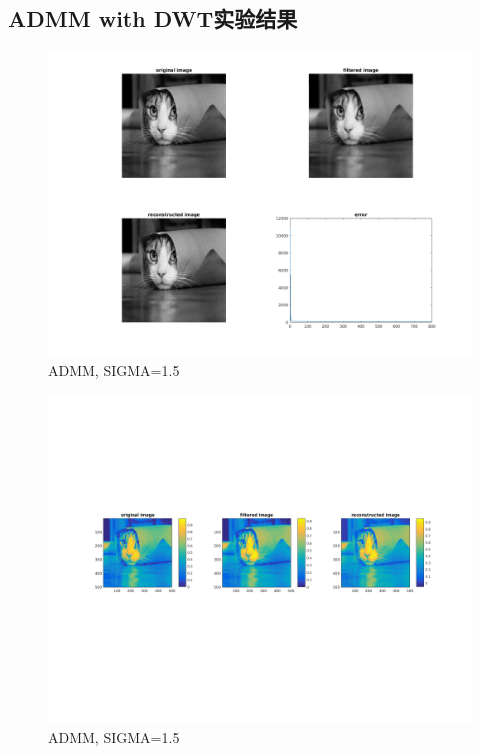 \documentclass[a4paper, UTF8]{ctexrep}
\begin{document}
		\subsection{ADMM with DWT实验结果} %
		\label{sub:admm_with_dwt实验结果}
			\begin{figure}[h]
				\centering
				\includegraphics[width=\textwidth]{hw4_fig1.png}
				\caption{ADMM, SIGMA=1.5}
				\label{fig:figure1}
			\end{figure}
			\clearpage
			\begin{figure}[h]
				\centering
				\includegraphics[width=\textwidth]{hw4_fig2.png}
				\caption{ADMM, SIGMA=1.5}
				\label{fig:figure1}
			\end{figure}
			\clearpage
\end{document}
